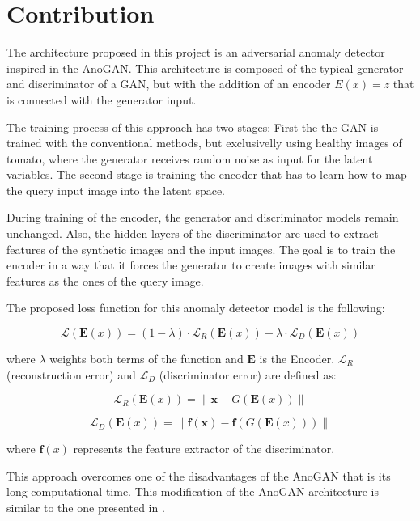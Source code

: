 \section{Contribution}

The architecture proposed in this project is an adversarial anomaly detector inspired in the AnoGAN. This architecture is composed of the typical generator and discriminator of a GAN, but with the addition of an encoder \begin{math}E(x) = z\end{math} that is connected with the generator input.

The training process of this approach has two stages: First the the GAN is trained with the conventional methods, but exclusivelly using healthy images of tomato, where the generator receives random noise as input for the latent variables. The second stage is training the encoder that has to learn how to map the query input image into the latent space.

During training of the encoder, the generator and discriminator models remain unchanged. Also, the hidden layers of the discriminator are used to extract features of the synthetic images and the input images. The goal is to train the encoder in a way that it forces the generator to create images with similar features as the ones of the query image.

The proposed loss function for this anomaly detector model is the following:

\begin{equation}
 \mathcal{L}\left(\mathbf{E}(x)\right)=(1-\lambda) \cdot \mathcal{L}_{R}\left(\mathbf{E}(x)\right)+\lambda \cdot \mathcal{L}_{D}\left(\mathbf{E}(x)\right)
\end{equation}

where \begin{math}\lambda\end{math} weights both terms of the function and $\mathbf{E}$ is the Encoder. \begin{math}\mathcal{L}_{R}\end{math} (reconstruction error) and \begin{math}\mathcal{L}_{D}\end{math} (discriminator error) are defined as:

\begin{equation}
 \mathcal{L}_{R}\left(\mathbf{E}(x)\right)=\left\|\mathbf{x}-G\left(\mathbf{E}(x)\right)\right\|
\end{equation}

\begin{equation}
 \mathcal{L}_{D}\left(\mathbf{E}(x)\right)=\left\|\mathbf{f}(\mathbf{x})-\mathbf{f}\left(G\left(\mathbf{E}(x)\right)\right)\right\|
\end{equation}

where \begin{math}\mathbf{f}(x)\end{math} represents the feature extractor of the discriminator.

This approach overcomes one of the disadvantages of the AnoGAN that is its long computational time. This modification of the AnoGAN architecture is similar to the one presented in \cite{Schlegl2019}.
